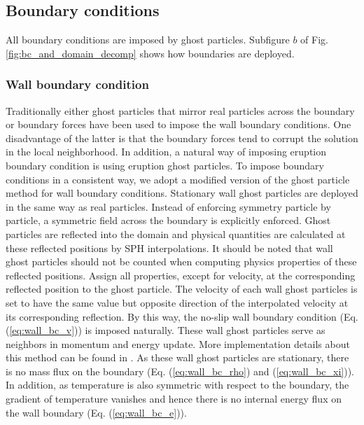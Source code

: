 \documentclass[journal abbreviation, manuscript]{copernicus}
\begin{document}
\subsection{Boundary conditions}
All boundary conditions are imposed by ghost particles. Subfigure $b$ of Fig. \ref{fig:bc_and_domain_decomp} shows how boundaries are deployed. 
\subsubsection{Wall boundary condition}
Traditionally either ghost particles that mirror real particles across the boundary \citep {ferrari2009new} or boundary forces \citep {monaghan2009sph} have been used to impose the wall boundary conditions. One disadvantage of the latter  is that the boundary forces tend to corrupt the solution in the local neighborhood. In addition, a natural way of imposing eruption boundary condition is using eruption ghost particles. To impose boundary conditions in a consistent way, we adopt a modified version of the ghost particle method \citep {kumar2013parallel} for wall boundary conditions. Stationary wall ghost particles are deployed in the same way as real particles. Instead of enforcing symmetry particle by particle, a symmetric field across the boundary is explicitly enforced. Ghost particles are reflected into the domain and physical quantities are calculated at these reflected positions by SPH interpolations. It should be noted that wall ghost particles should not be counted when computing physics properties of these reflected positions. Assign all properties, except for velocity, at the corresponding reflected position to the ghost particle. The velocity of each wall ghost particles is set to have the same value but opposite direction of the interpolated velocity at its corresponding reflection. By this way, the no-slip wall boundary condition (Eq. (\ref{eq:wall_bc_v})) is imposed naturally. These wall ghost particles serve as neighbors in momentum and energy update. More implementation details about this method can be found in \citep {kumar2013parallel}. As these wall ghost particles are stationary, there is no mass flux on the boundary (Eq. (\ref{eq:wall_bc_rho}) and (\ref{eq:wall_bc_xi})). In addition, as temperature is also symmetric with respect to the boundary, the gradient of temperature vanishes and hence there is no internal energy flux on the wall boundary (Eq. (\ref{eq:wall_bc_e})). 
\end{document}

